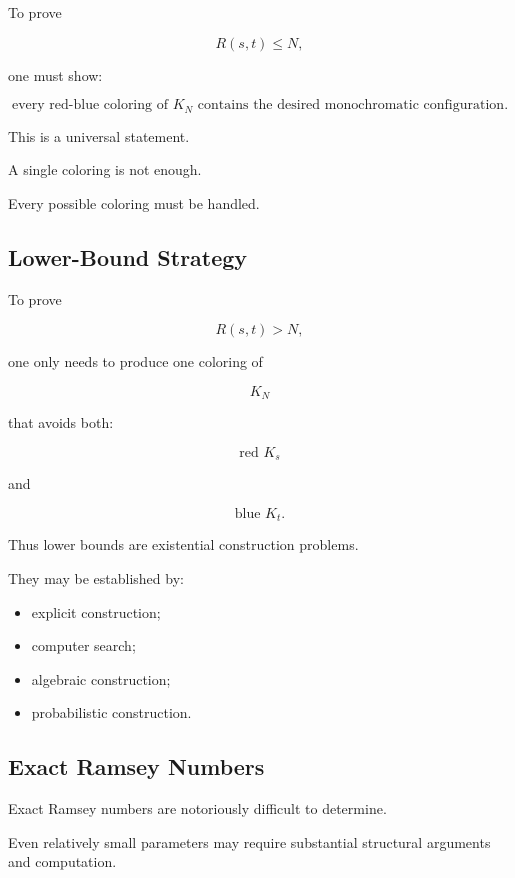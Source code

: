 To prove

\[
R(s,t)\leq N,
\]

one must show:

\[
\boxed{
\text{every red-blue coloring of }K_N
\text{ contains the desired monochromatic configuration}.
}
\]

This is a universal statement.

A single coloring is not enough.

Every possible coloring must be handled.

\subsection{Lower-Bound Strategy}
\label{subsec:ramsey-lower-bound-strategy}

To prove

\[
R(s,t)>N,
\]

one only needs to produce one coloring of

\[
K_N
\]

that avoids both:

\[
\text{red }K_s
\]

and

\[
\text{blue }K_t.
\]

Thus lower bounds are existential construction problems.

They may be established by:

\begin{itemize}
    \item explicit construction;
    \item computer search;
    \item algebraic construction;
    \item probabilistic construction.
\end{itemize}

\subsection{Exact Ramsey Numbers}
\label{subsec:exact-ramsey-numbers}

Exact Ramsey numbers are notoriously difficult to determine.

Even relatively small parameters may require substantial structural
arguments and computation.

